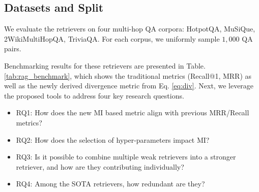 \documentclass{article}
\theoremstyle{plain}
\theoremstyle{definition}
\theoremstyle{remark}
\begin{document}




\subsection{Datasets and Split}
We evaluate the retrievers on four multi-hop QA corpora: HotpotQA, MuSiQue, 2WikiMultiHopQA, TriviaQA.
For each corpus, we uniformly sample $1{,}000$ QA pairs.


Benchmarking results for these retrievers are presented in Table. \ref{tab:rag_benchmark}, which shows the traditional metrics (Recall@1, MRR) as well as the newly derived divergence metric from Eq. \eqref{eq:div}.
Next, we leverage the proposed tools to address four key research questions.

\begin{itemize}
    \item RQ1: How does the new MI based metric align with previous MRR/Recall metrics?
    \item RQ2: How does the selection of hyper-parameters impact MI?
    \item RQ3: Is it possible to combine multiple weak retrievers into a stronger retriever, and how are they contributing individually?
    \item RQ4: Among the SOTA retrievers, how redundant are they? 
\end{itemize}
\end{document}
